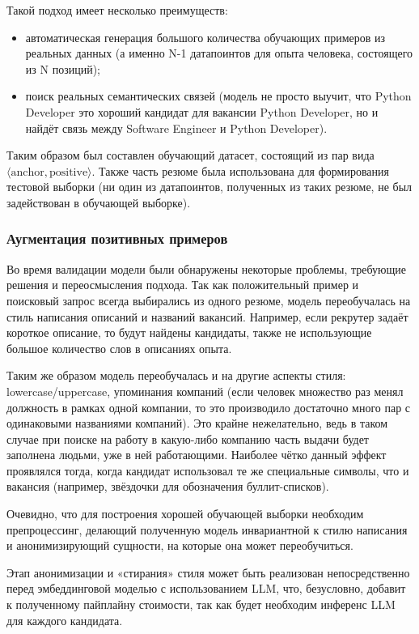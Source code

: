 \documentclass[14pt]{mmcs_article}
\begin{document}
Такой подход имеет несколько преимуществ:
\begin{itemize}
  \item автоматическая генерация большого количества обучающих примеров из реальных данных (а именно N-1 датапоинтов для опыта человека, состоящего из N позиций);
  \item поиск реальных семантических связей (модель не просто выучит, что Python Developer это хороший кандидат для вакансии Python Developer, но и найдёт связь между Software Engineer и Python Developer).
\end{itemize}

Таким образом был составлен обучающий датасет, состоящий из пар вида $\langle\text{anchor},\text{positive}\rangle$. Также часть резюме была использована для формирования тестовой выборки (ни один из датапоинтов, полученных из таких резюме, не был задействован в обучающей выборке).

\subsubsection*{Аугментация позитивных примеров}

Во время валидации модели были обнаружены некоторые проблемы, требующие решения и переосмысления подхода.
Так как положительный пример и поисковый запрос всегда выбирались из одного резюме, модель переобучалась на стиль написания описаний и названий вакансий. Например, если рекрутер задаёт короткое описание, то будут найдены кандидаты, также не использующие большое количество слов в описаниях опыта.

Таким же образом модель переобучалась и на другие аспекты стиля: lowercase/uppercase, упоминания компаний (если человек множество раз менял должность в рамках одной компании, то это производило достаточно много пар с одинаковыми названиями компаний). Это крайне нежелательно, ведь в таком случае при поиске на работу в какую-либо компанию часть выдачи будет заполнена людьми, уже в ней работающими. Наиболее чётко данный эффект проявлялся тогда, когда кандидат использовал те же специальные символы, что и вакансия (например, звёздочки для обозначения буллит-списков).

Очевидно, что для построения хорошей обучающей выборки необходим препроцессинг, делающий полученную модель инвариантной к стилю написания и анонимизирующий сущности, на которые она может переобучиться.

Этап анонимизации и «стирания» стиля может быть реализован непосредственно перед эмбеддинговой моделью с использованием LLM, что, безусловно, добавит к полученному пайплайну стоимости, так как будет необходим инференс LLM для каждого кандидата.
\end{document}
